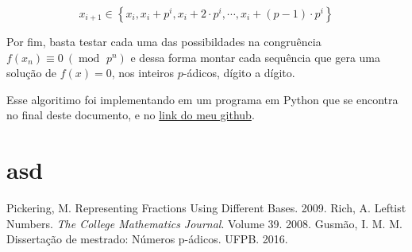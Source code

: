 \documentclass{report}
\DeclareMathOperator{\modulo}{mod \ }
\theoremstyle{definition}
\begin{document}
\begin{equation}
    x_{i+1} \in \left\lbrace x_i, x_i + p^i, x_i + 2\cdot p^i, \cdots, x_i + (p-1) \cdot p^i \right\rbrace
\end{equation}

Por fim, basta testar cada uma das possibildades na congruência $f(x_n) \equiv 0 \ (\modulo p^n)$ e dessa forma montar cada sequência que gera uma solução de $f(x) = 0$, nos inteiros $p$-ádicos, dígito a dígito.

Esse algoritimo foi implementando em um programa em Python que se encontra no final deste documento, e no \href{https://www.youtube.com/watch?v=dQw4w9WgXcQ}{link do meu github}.

\section{asd}




\nocite{*}
\begin{thebibliography}{3}
\bibitem{} Pickering, M. Representing Fractions Using Different Bases. 2009.
\bibitem{} Rich, A. Leftist Numbers. \textit{The College Mathematics Journal}. Volume 39. 2008.
\bibitem{} Gusmão, I. M. M. Dissertação de mestrado: Números p-ádicos. UFPB. 2016. 
\end{thebibliography}


\end{document}
